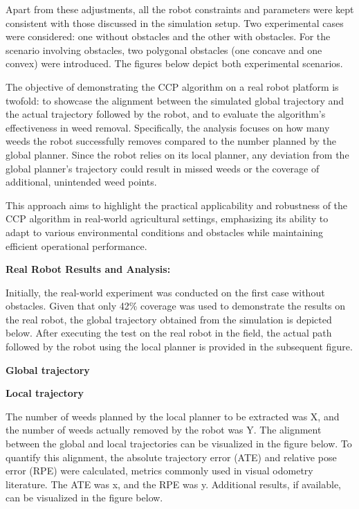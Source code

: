 Apart from these adjustments, all the robot constraints and parameters were kept consistent with those discussed in the simulation setup. Two experimental cases were considered: one without obstacles and the other with obstacles. For the scenario involving obstacles, two polygonal obstacles (one concave and one convex) were introduced. The figures below depict both experimental scenarios. 


\vspace*{6mm}   


The objective of demonstrating the CCP algorithm on a real robot platform is twofold: to showcase the alignment between the simulated global trajectory and the actual trajectory followed by the robot, and to evaluate the algorithm's effectiveness in weed removal. Specifically, the analysis focuses on how many weeds the robot successfully removes compared to the number planned by the global planner. Since the robot relies on its local planner, any deviation from the global planner's trajectory could result in missed weeds or the coverage of additional, unintended weed points.

\vspace*{6mm}   


This approach aims to highlight the practical applicability and robustness of the CCP algorithm in real-world agricultural settings, emphasizing its ability to adapt to various environmental conditions and obstacles while maintaining efficient operational performance.

\vspace*{6mm}   


\textbf{Real Robot Results and Analysis:}    

Initially, the real-world experiment was conducted on the first case without obstacles. Given that only 42\% coverage was used to demonstrate the results on the real robot, the global trajectory obtained from the simulation is depicted below. After executing the test on the real robot in the field, the actual path followed by the robot using the local planner is provided in the subsequent figure.

\textbf{Global trajectory}

\textbf{Local trajectory}


\vspace*{6mm}   


The number of weeds planned by the local planner to be extracted was X, and the number of weeds actually removed by the robot was Y. The alignment between the global and local trajectories can be visualized in the figure below. To quantify this alignment, the absolute trajectory error (ATE) and relative pose error (RPE) were calculated, metrics commonly used in visual odometry literature. The ATE was x, and the RPE was y. Additional results, if available, can be visualized in the figure below.

